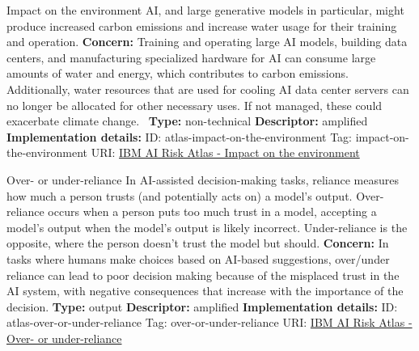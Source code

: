 \documentclass[a4paper,12pt]{article}
\begin{document}
\begin{definitionbox}{Impact on the environment}
AI, and large generative models in particular, might produce increased carbon emissions and increase water usage for their training and operation.\newline\newline
\textbf{Concern: }Training and operating large AI models, building data centers, and manufacturing specialized hardware for AI can consume large amounts of water and energy, which contributes to carbon emissions. Additionally, water resources that are used for cooling AI data center servers can no longer be allocated for other necessary uses. If not managed, these could exacerbate climate change. \newline\newline
\textbf{Type: }non-technical\newline
\textbf{Descriptor: }amplified \newline\newline
\textbf{Implementation details: } \newline
ID: atlas-impact-on-the-environment \newline
Tag: impact-on-the-environment \newline
URI:  \href{https://www.ibm.com/docs/en/watsonx/saas?topic=SSYOK8/wsj/ai-risk-atlas/impact-on-the-environment.html}{IBM AI Risk Atlas - Impact on the environment}\newline
\end{definitionbox}
\begin{definitionbox}{Over- or under-reliance}
In AI-assisted decision-making tasks, reliance measures how much a person trusts (and potentially acts on) a model's output. Over-reliance occurs when a person puts too much trust in a model, accepting a model's output when the model's output is likely incorrect. Under-reliance is the opposite, where the person doesn't trust the model but should.\newline\newline
\textbf{Concern: }In tasks where humans make choices based on AI-based suggestions, over/under reliance can lead to poor decision making because of the misplaced trust in the AI system, with negative consequences that increase with the importance of the decision.\newline\newline
\textbf{Type: }output\newline
\textbf{Descriptor: }amplified \newline\newline
\textbf{Implementation details: } \newline
ID: atlas-over-or-under-reliance \newline
Tag: over-or-under-reliance \newline
URI:  \href{https://www.ibm.com/docs/en/watsonx/saas?topic=SSYOK8/wsj/ai-risk-atlas/over-or-under-reliance.html}{IBM AI Risk Atlas - Over- or under-reliance}\newline
\end{definitionbox}
\end{document}
